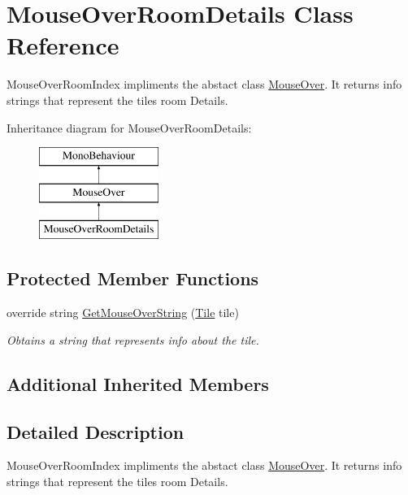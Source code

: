 \hypertarget{class_mouse_over_room_details}{}\section{Mouse\+Over\+Room\+Details Class Reference}
\label{class_mouse_over_room_details}


Mouse\+Over\+Room\+Index impliments the abstact class \hyperlink{class_mouse_over}{Mouse\+Over}. It returns info strings that represent the tiles room Details.  


Inheritance diagram for Mouse\+Over\+Room\+Details\+:\begin{figure}[H]
\begin{center}
\leavevmode
\includegraphics[height=3.000000cm]{class_mouse_over_room_details}
\end{center}
\end{figure}
\subsection*{Protected Member Functions}
\begin{DoxyCompactItemize}
\item 
override string \hyperlink{class_mouse_over_room_details_aaac2329038d3c038cbf60d82b89b6bd0}{Get\+Mouse\+Over\+String} (\hyperlink{class_tile}{Tile} tile)
\begin{DoxyCompactList}\small\item\em Obtains a string that represents info about the tile. \end{DoxyCompactList}\end{DoxyCompactItemize}
\subsection*{Additional Inherited Members}


\subsection{Detailed Description}
Mouse\+Over\+Room\+Index impliments the abstact class \hyperlink{class_mouse_over}{Mouse\+Over}. It returns info strings that represent the tiles room Details. 



